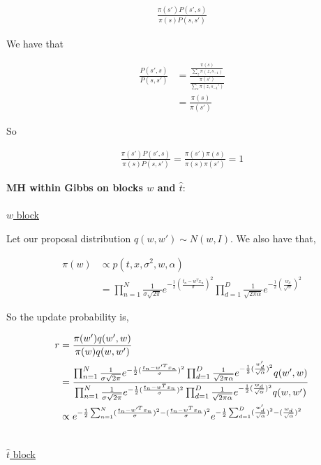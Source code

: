 \documentclass[10pt]{homeworg}
\begin{document}
\begin{align*}
\frac{\pi(s')P(s',s)}{\pi(s)P(s,s')}
\end{align*}

We have that

\begin{align*}
\frac{P(s',s)}{P(s,s')} &= \frac{\frac{\pi(s)}{\sum_z \pi(z,s_{-1})}}{\frac{\pi(s')}{\sum_z \pi(z, s_{-1}')}}\\
					   &= \frac{\pi(s)}{\pi(s')}
\end{align*}

So

\begin{align*}
\frac{\pi(s')P(s',s)}{\pi(s)P(s,s')} = \frac{\pi(s')\pi(s)}{\pi(s)\pi(s')} = 1
\end{align*}



\exercise 
\textbf{MH within Gibbs on blocks $w$ and $\hat{t}$}:\\
\\
\underline{$w$ block}

Let our proposal distribution $q(w,w') \sim N(w,I)$. We also have that,

\begin{align*}
\pi(w) &\propto p(t,x,\sigma^2,w,\alpha)\\
	   &= \prod_{n=1}^N \frac{1}{\sigma \sqrt{2\pi}} e^{-\frac{1}{2}(\frac{t_n-w^Tx_n}{\sigma})^2} \prod_{d=1}^D \frac{1}{\sqrt{2\pi\alpha}} e^{-\frac{1}{2} (\frac{w_d}{\sqrt{\alpha}})^2}
\end{align*}

So the update probability is,

\begin{align*}
r &= \frac{\pi(w')q(w',w)}{\pi(w)q(w,w')}\\
\vspace{0.5cm}
  &= \frac{\prod_{n=1}^N \frac{1}{\sigma \sqrt{2\pi}} e^{-\frac{1}{2}(\frac{t_n-w'^Tx_n}{\sigma})^2} \prod_{d=1}^D \frac{1}{\sqrt{2\pi\alpha}} e^{-\frac{1}{2} (\frac{w'_d}{\sqrt{\alpha}})^2} q(w',w)}{\prod_{n=1}^N \frac{1}{\sigma \sqrt{2\pi}} e^{-\frac{1}{2}(\frac{t_n-w^Tx_n}{\sigma})^2} \prod_{d=1}^D \frac{1}{\sqrt{2\pi\alpha}} e^{-\frac{1}{2} (\frac{w_d}{\sqrt{\alpha}})^2} q(w,w')}\\
  \vspace{0.5cm}
  &\propto e^{-\frac{1}{2}\sum_{n=1}^N (\frac{t_n-w'^Tx_n}{\sigma})^2 - (\frac{t_n-w^Tx_n}{\sigma})^2} e^{-\frac{1}{2}\sum_{d=1}^D (\frac{w'_d}{\sqrt{\alpha}})^2 - (\frac{w_d}{\sqrt{\alpha}})^2}
\end{align*}


\\
\underline{$\hat{t}$ block}
\end{document}
